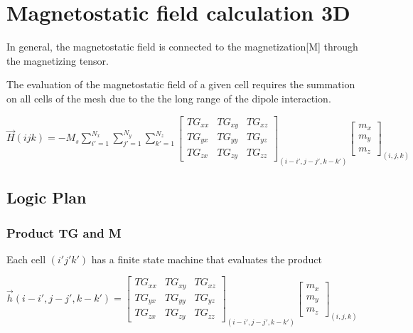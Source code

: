 \chapter{Magnetostatic field calculation 3D}
In general, the magnetostatic field is connected to the magnetization[M] through the magnetizing tensor.


  The evaluation of the magnetostatic field of a given cell requires the summation on all cells of the mesh due to the the long range of the dipole interaction.
  
  \begin{center} \label{3d_formula}
  	$ \overrightarrow{H}(ijk)=-M_{s}\sum\limits_{i'=1}^{N_{x}} \sum\limits_{j'=1}^{N_{y}}\sum\limits_{k'=1}^{N_{z}}\begin{bmatrix}
  	TG_{xx} & TG_{xy} & TG_{xz}\\
  	TG_{yx} & TG_{yy}& TG_{yz}    	\\
  	TG_{zx}&TG_{zy} & TG_{zz}  
  	\end{bmatrix}_{(i-i',j-j',k-k')}\begin{bmatrix}
  	m_{x}\\
  	m_{y}\\
  	m_{z}\end{bmatrix}_{(i,j,k)}$
  \end{center}
  
  \section{Logic Plan}
  
  \subsection{Product TG and M}
  Each cell $ (i'j'k') $ has a finite state machine that evaluates the product
  \begin{center}
  		$ \overrightarrow{h}(i-i',j-j',k-k')= \begin{bmatrix}
  	TG_{xx} & TG_{xy} & TG_{xz}\\
  	TG_{yx} & TG_{yy}& TG_{yz}    	\\
  	TG_{zx}&TG_{zy} & TG_{zz}  
  	\end{bmatrix}_{(i-i',j-j',k-k')}\begin{bmatrix}
  	m_{x}\\
  	m_{y}\\
  	m_{z}\end{bmatrix}_{(i,j,k)}$
  \end{center} 
  
  